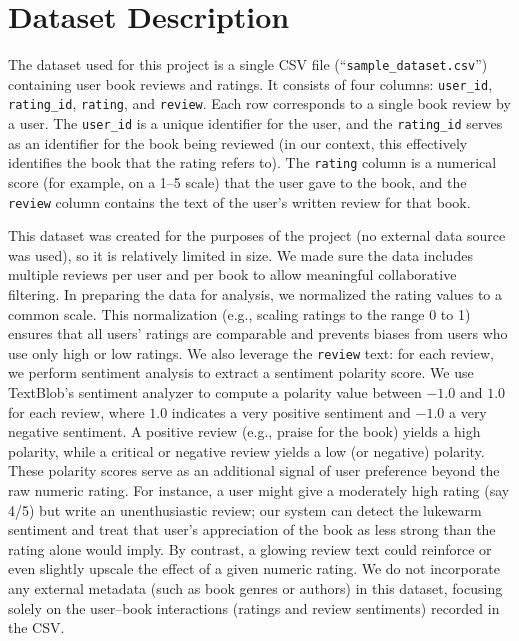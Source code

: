 \documentclass[11pt]{article}
\begin{document}
\section{Dataset Description}
The dataset used for this project is a single CSV file (``\texttt{sample\_dataset.csv}'') containing user book reviews and ratings. It consists of four columns: \texttt{user\_id}, \texttt{rating\_id}, \texttt{rating}, and \texttt{review}. Each row corresponds to a single book review by a user. The \texttt{user\_id} is a unique identifier for the user, and the \texttt{rating\_id} serves as an identifier for the book being reviewed (in our context, this effectively identifies the book that the rating refers to). The \texttt{rating} column is a numerical score (for example, on a 1--5 scale) that the user gave to the book, and the \texttt{review} column contains the text of the user’s written review for that book.

This dataset was created for the purposes of the project (no external data source was used), so it is relatively limited in size. We made sure the data includes multiple reviews per user and per book to allow meaningful collaborative filtering. In preparing the data for analysis, we normalized the rating values to a common scale. This normalization (e.g., scaling ratings to the range 0 to 1) ensures that all users’ ratings are comparable and prevents biases from users who use only high or low ratings. We also leverage the \texttt{review} text: for each review, we perform sentiment analysis to extract a sentiment polarity score. We use TextBlob’s sentiment analyzer to compute a polarity value between $-1.0$ and $1.0$ for each review, where $1.0$ indicates a very positive sentiment and $-1.0$ a very negative sentiment. A positive review (e.g., praise for the book) yields a high polarity, while a critical or negative review yields a low (or negative) polarity. These polarity scores serve as an additional signal of user preference beyond the raw numeric rating. For instance, a user might give a moderately high rating (say 4/5) but write an unenthusiastic review; our system can detect the lukewarm sentiment and treat that user’s appreciation of the book as less strong than the rating alone would imply. By contrast, a glowing review text could reinforce or even slightly upscale the effect of a given numeric rating. We do not incorporate any external metadata (such as book genres or authors) in this dataset, focusing solely on the user–book interactions (ratings and review sentiments) recorded in the CSV.
\end{document}
